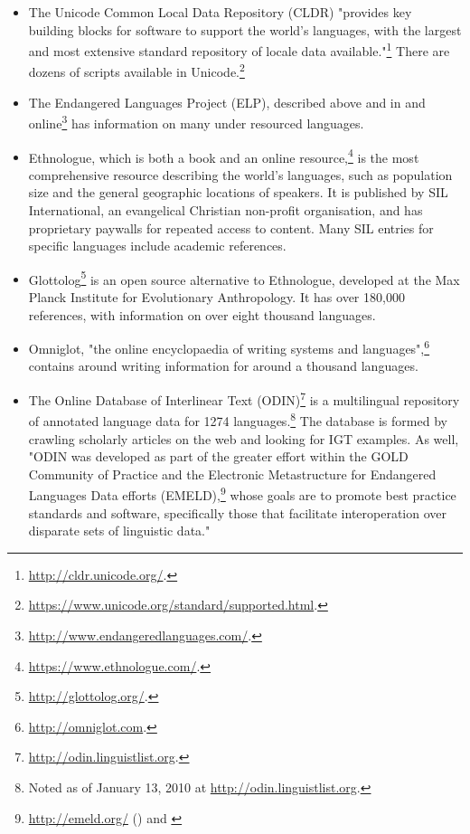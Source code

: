 \begin{itemize}
\item The Unicode Common Local Data Repository (CLDR) "provides key \\ building blocks for software to support the world's languages, with the largest and most extensive standard repository of locale data available."\footnote{\href{http://cldr.unicode.org/}{http://cldr.unicode.org/}. } There are dozens of scripts available in Unicode.\footnote{\href{https://www.unicode.org/standard/supported.html}{https://www.unicode.org/standard/supported.html}. }

\item The Endangered Languages Project (ELP), described above and in \citet{lee2016assessing} and online\footnote{\href{http://www.endangeredlanguages.com/}{http://www.endangeredlanguages.com/}. } has information on many under resourced languages.

\item Ethnologue, which is both a book \citep{lewis2009ethnologue} and an online resource,\footnote{\href{https://www.ethnologue.com/}{https://www.ethnologue.com/}. } is the most comprehensive resource describing the world's languages, such as population size and the general geographic locations of speakers. It is published by SIL International, an evangelical Christian non-profit organisation, and has proprietary paywalls for repeated access to content. Many SIL entries for specific languages include academic references.

\item Glottolog\footnote{\href{http://glottolog.org/}{http://glottolog.org/}. } is an open source alternative to Ethnologue, developed at the Max Planck Institute for Evolutionary Anthropology. It has over 180,000 references, with information on over eight thousand languages. \citep{hammarstrom2015glottolog}

\item Omniglot, "the online encyclopaedia of writing systems and languages",\footnote{\href{http://omniglot.com}{http://omniglot.com}. } contains around writing information for around a thousand languages. \citep{ager2008omniglot}

\item The Online Database of Interlinear Text (ODIN)\footnote{\href{http://odin.linguistlist.org}{http://odin.linguistlist.org}. } is a multilingual repository of annotated language data for 1274 languages.\footnote{Noted as of January 13, 2010 at \href{http://odin.linguistlist.org}{http://odin.linguistlist.org}. } The database is formed by crawling scholarly articles on the web and looking for IGT examples. As well, "ODIN was developed as part of the greater effort within the GOLD Community of Practice \citep{farrar2007gold} and the Electronic Metastructure for Endangered Languages Data efforts (EMELD),\footnote{\href{http://emeld.org/}{http://emeld.org/} () and \citet{farrar2002common}} whose goals are to promote best practice standards and software, specifically those that facilitate interoperation over disparate sets of linguistic data." \citep{lewis2010developing}


\end{itemize}
